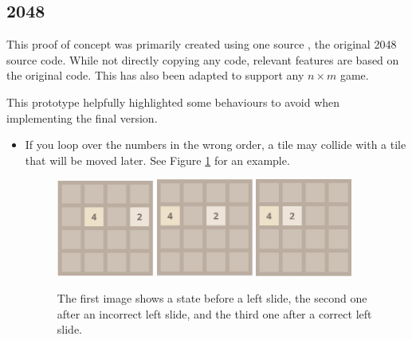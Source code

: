 \documentclass{article}
\begin{document}
\subsection{2048}
\label{subsec:2048}
This proof of concept was primarily created using one source \cite{source2048}, the original 2048 source code. While not
directly copying any code, relevant features are based on the original code. This has also been adapted to support any $n \times m$ game.

This prototype helpfully highlighted some behaviours to avoid when implementing the final version.
\begin{itemize}
    \item If you loop over the numbers in the wrong order, a tile may collide with a tile that will be moved later. 
    See Figure \ref{fig:slidebug} for an example.
    \begin{figure}
        \centering
        \includegraphics[width=0.3\textwidth]{2048_slide.png}
        \includegraphics[width=0.3\textwidth]{2048_slide2.png}
        \includegraphics[width=0.3\textwidth]{2048_slide3.png}
        \caption{The first image shows a state before a left slide, the second one after an incorrect left slide, and the third one after a correct left slide.}
        \label{fig:slidebug}
    \end{figure}

\end{itemize}
\end{document}
